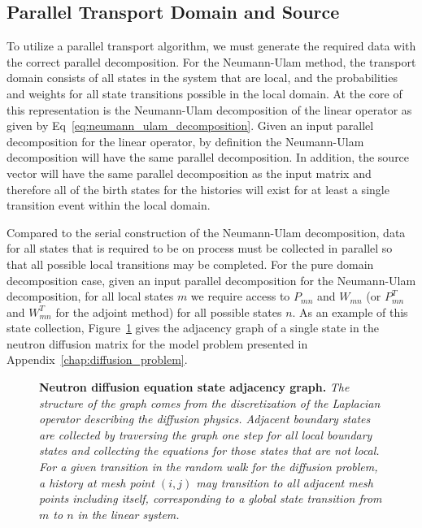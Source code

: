 \subsection{Parallel Transport Domain and Source }
\label{subsec:domain_generation}
To utilize a parallel transport algorithm, we must generate the
required data with the correct parallel decomposition. For the
Neumann-Ulam method, the transport domain consists of all states in
the system that are local, and the probabilities and weights for all
state transitions possible in the local domain. At the core of this
representation is the Neumann-Ulam decomposition of the linear
operator as given by Eq~\ref{eq:neumann_ulam_decomposition}. Given an
input parallel decomposition for the linear operator, by definition
the Neumann-Ulam decomposition will have the same parallel
decomposition. In addition, the source vector will have the same
parallel decomposition as the input matrix and therefore all of the
birth states for the histories will exist for at least a single
transition event within the local domain.

Compared to the serial construction of the Neumann-Ulam decomposition,
data for all states that is required to be on process must be
collected in parallel so that all possible local transitions may be
completed. For the pure domain decomposition case, given an input
parallel decomposition for the Neumann-Ulam decomposition, for all
local states $m$ we require access to $P_{mn}$ and $W_{mn}$ (or
$P^T_{mn}$ and $W^T_{mn}$ for the adjoint method) for all possible
states $n$. As an example of this state collection,
Figure~\ref{fig:diffusion_graph} gives the adjacency graph of a single
state in the neutron diffusion matrix for the model problem presented
in Appendix~\ref{chap:diffusion_problem}.

\begin{figure}[t!]
  \begin{center}
    \scalebox{1.5}{  }
  \end{center}
  \caption{\textbf{Neutron diffusion equation state adjacency graph.}
    \textit{The structure of the graph comes from the discretization
      of the Laplacian operator describing the diffusion
      physics. Adjacent boundary states are collected by traversing
      the graph one step for all local boundary states and collecting
      the equations for those states that are not local. For a given
      transition in the random walk for the diffusion problem, a
      history at mesh point $(i,j)$ may transition to all adjacent
      mesh points including itself, corresponding to a global state
      transition from $m$ to $n$ in the linear system.}}
  \label{fig:diffusion_graph}
\end{figure}

